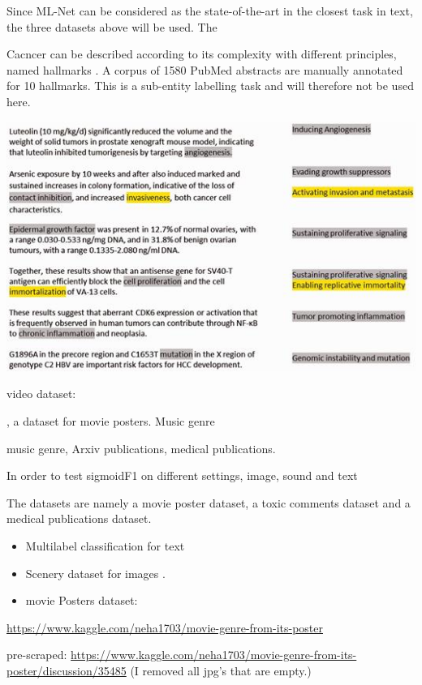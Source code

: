 \documentclass[sigconf,natbib,screen=true,review=true,anonymous]{acmart}
\begin{document}
Since ML-Net can be considered as the state-of-the-art in the closest task in text, the three datasets above will be used. The 

Cacncer can be described according to its complexity with different principles, named hallmarks \cite{cancerHallmarks}. A corpus of 1580 PubMed abstracts are manually annotated for 10 hallmarks. This is a sub-entity labelling task and will therefore not be used here.

\begin{center}
\includegraphics[width=.9\linewidth]{./images/cancerHallmarksAnnotation.jpg}
\end{center}


video dataset: \cite{holisticVideoData}

, a dataset for movie posters. Music genre 

music genre, Arxiv publications, medical publications.

In order to test sigmoidF1 on different settings, image, sound and text 


The datasets are namely a movie poster dataset, a toxic comments dataset and a medical publications dataset.


\begin{itemize}
\item Multilabel classification for text \cite{toxicComments}

\item Scenery dataset for images \cite{dataScenery}.

\item movie Posters dataset:
\end{itemize}

\url{https://www.kaggle.com/neha1703/movie-genre-from-its-poster}

pre-scraped: \url{https://www.kaggle.com/neha1703/movie-genre-from-its-poster/discussion/35485} (I removed all jpg's that are empty.)
\end{document}
